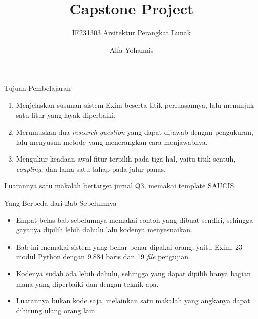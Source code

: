 \documentclass[aspectratio=169, table, 12pt]{beamer}
\title{\Huge{Capstone Project}}
\subtitle{IF231303 Arsitektur Perangkat Lunak}
\author{Alfa Yohannis}
\begin{document}
\frame{\titlepage}

\begin{frame}{{\Large Tujuan Pembelajaran}}
  \vspace{10pt}
  \begin{enumerate}
    \item Menjelaskan susunan sistem Exim beserta titik perluasannya, lalu
          menunjuk satu fitur yang layak diperbaiki.
    \item Merumuskan dua \textit{research question} yang dapat dijawab dengan
          pengukuran, lalu menyusun metode yang menerangkan cara menjawabnya.
    \item Mengukur keadaan awal fitur terpilih pada tiga hal, yaitu titik
          sentuh, \textit{coupling}, dan lama satu tahap pada jalur panas.
  \end{enumerate}

  \vspace{10pt}
  {\small Luarannya satu makalah bertarget jurnal Q3, memakai template SAUCIS.}
\end{frame}

\begin{frame}{{\Large Yang Berbeda dari Bab Sebelumnya}}
  \vspace{10pt}
  \begin{itemize}\small
    \item Empat belas bab sebelumnya memakai contoh yang dibuat sendiri,
          sehingga gayanya dipilih lebih dahulu lalu kodenya menyesuaikan.
    \item Bab ini memakai sistem yang benar-benar dipakai orang, yaitu Exim,
          23 modul Python dengan 9.884 baris dan 19 \textit{file} pengujian.
    \item Kodenya sudah ada lebih dahulu, sehingga yang dapat dipilih hanya
          bagian mana yang diperbaiki dan dengan teknik apa.
    \item Luarannya bukan kode saja, melainkan satu makalah yang angkanya
          dapat dihitung ulang orang lain.
  \end{itemize}
\end{frame}
\end{document}
